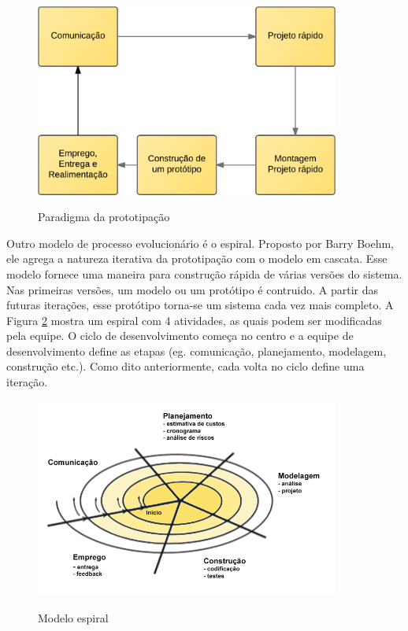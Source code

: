\begin{figure}[htb!]
\begin{center}
\caption{Paradigma da prototipação}
\label{fig:06}
\includegraphics[width=10cm]{assets/prototipacao} \\
\end{center}
\end{figure}

Outro modelo de processo evolucionário é o espiral. Proposto por Barry Boehm, ele agrega a natureza iterativa da prototipação com o modelo em cascata. Esse modelo fornece uma maneira para construção rápida de várias versões do sistema. Nas primeiras versões, um modelo ou um protótipo é contruido. A partir das futuras iterações, esse protótipo torna-se um sistema cada vez mais completo. A Figura \ref{fig:07} mostra um espiral com 4 atividades, as quais podem ser modificadas pela equipe. O ciclo de desenvolvimento começa no centro e a equipe de desenvolvimento define as etapas (eg. comunicação, planejamento, modelagem, construção etc.). Como dito anteriormente, cada volta no ciclo define uma iteração.

\begin{figure}[htb!]
\begin{center}
\caption{Modelo espiral}
\label{fig:07}
\includegraphics[width=10cm]{assets/espiral} \\
\end{center}
\end{figure}

